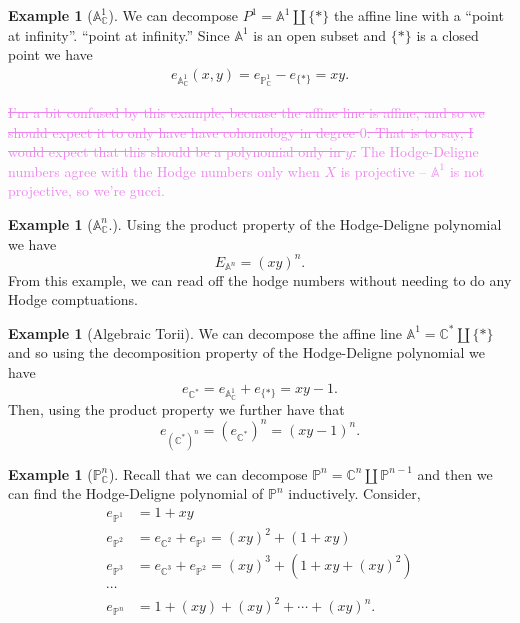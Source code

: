 \documentclass{article}
\theoremstyle{definition}
\newtheorem{example}[theorem]{Example}
\theoremstyle{remark}
\newcommand{\wg}[1]{\textcolor{violet}{#1}}
\newcommand{\C}{\mathbb C}
\renewcommand{\P}{\mathbb P}
\begin{document}
\begin{example}[$\mathbb A^1_\C$]
    We can decompose $P^1 = \mathbb A^1 \amalg \{*\}$ the affine
    line with a ``point at infinity''.
    ``point at infinity.'' Since $\mathbb A^1$ is an open subset and
    $\{*\}$ is a closed point we have 
    \begin{align*}
        e_{\mathbb A^1_\C}(x,y) = e_{\P^1_\C} - e_{\{*\}} = xy.
    \end{align*}

    \wg{\sout{I'm a bit confused by this example, becuase the affine line is
    affine, and so we should expect it to only have have cohomology in
    degree $0$. That is to say, I would expect that this should be a
    polynomial only in $y$.} The Hodge-Deligne numbers agree with
    the Hodge numbers only when $X$ is projective -- $\mathbb A^1$ is not
    projective, so we're gucci.}
\end{example}

\begin{example}[$\mathbb A^n_\C$.]
    Using the product property of the Hodge-Deligne polynomial we have
    \[
        E_{\mathbb A^n} = (xy)^n.
    \]
    From this example, we can read off the hodge numbers without
    needing to do any Hodge comptuations.
\end{example}

\begin{example}[Algebraic Torii]
    We can decompose the affine line $\mathbb A^1 = \C^* \amalg \{*\}$
    and so using the decomposition property of the Hodge-Deligne
    polynomial we have
    \[
        e_{\C^*} = e_{\mathbb A^1_\C} + e_{\{*\}} = xy - 1.
    \]
    Then, using the product property we further have that 
    \[
        e_{(\C^*)^n}  = (e_{\C^*})^n = (xy-1)^n. 
    \]  
\end{example}

\begin{example}[$\P^n_\C$]
    Recall that we can decompose $\P^n = \C^{n} \amalg \P^{n-1}$
    and then we can find the Hodge-Deligne polynomial of $\P^n$
    inductively. Consider,
    \begin{align*}
        e_{\P^1} &= 1 + xy \\
        e_{\P^2} &= e_{\C^2} + e_{\P^1} = (xy)^2 + (1 + xy) \\
        e_{\P^3} &= e_{\C^3} + e_{\P^2} = (xy)^3 + (1 + xy + (xy)^2) \\
        \cdots & \\
        e_{\P^n} &= 1 + (xy) + (xy)^2 + \cdots + (xy)^n. 
    \end{align*}
\end{example}
\end{document}
